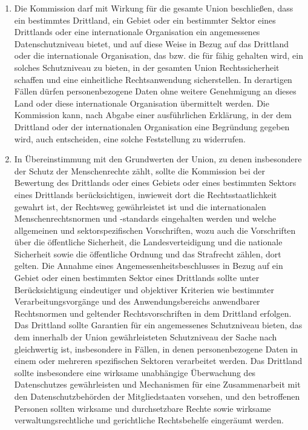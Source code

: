 \begin{enumerate}
   \item Die Kommission darf mit Wirkung für die gesamte Union beschließen, dass ein bestimmtes Drittland, ein Gebiet
    oder ein bestimmter Sektor eines Drittlands oder eine internationale Organisation ein angemessenes
    Datenschutzniveau bietet, und auf diese Weise in Bezug auf das Drittland oder die internationale Organisation, das
    bzw. die für fähig gehalten wird, ein solches Schutzniveau zu bieten, in der gesamten Union Rechtssicherheit
    schaffen und eine einheitliche Rechtsanwendung sicherstellen. In derartigen Fällen dürfen personenbezogene Daten
    ohne weitere Genehmigung an dieses Land oder diese internationale Organisation übermittelt werden. Die Kommission
    kann, nach Abgabe einer ausführlichen Erklärung, in der dem Drittland oder der internationalen Organisation eine
    Begründung gegeben wird, auch entscheiden, eine solche Feststellung zu widerrufen.%
   \label{eg:103}
   

   \item In Übereinstimmung mit den Grundwerten der Union, zu denen insbesondere der Schutz der Menschenrechte zählt,
    sollte die Kommission bei der Bewertung des Drittlands oder eines Gebiets oder eines bestimmten Sektors eines
    Drittlands berücksichtigen, inwieweit dort die Rechtsstaatlichkeit gewahrt ist, der Rechtsweg gewährleistet ist und
    die internationalen Menschenrechtsnormen und -standards eingehalten werden und welche allgemeinen und
    sektorspezifischen Vorschriften, wozu auch die Vorschriften über die öffentliche Sicherheit, die Landesverteidigung
    und die nationale Sicherheit sowie die öffentliche Ordnung und das Strafrecht zählen, dort gelten. Die Annahme
    eines Angemessenheitsbeschlusses in Bezug auf ein Gebiet oder einen bestimmten Sektor eines Drittlands sollte unter
    Berücksichtigung eindeutiger und objektiver Kriterien wie bestimmter Verarbeitungsvorgänge und des
    Anwendungsbereichs anwendbarer Rechtsnormen und geltender Rechtsvorschriften in dem Drittland erfolgen. Das
    Drittland sollte Garantien für ein angemessenes Schutzniveau bieten, das dem innerhalb der Union gewährleisteten
    Schutzniveau der Sache nach gleichwertig ist, insbesondere in Fällen, in denen personenbezogene Daten in einem oder
    mehreren spezifischen Sektoren verarbeitet werden. Das Drittland sollte insbesondere eine wirksame unabhängige
    Überwachung des Datenschutzes gewährleisten und Mechanismen für eine Zusammenarbeit mit den Datenschutzbehörden der
    Mitgliedstaaten vorsehen, und den betroffenen Personen sollten wirksame und durchsetzbare Rechte sowie wirksame
    verwaltungsrechtliche und gerichtliche Rechtsbehelfe eingeräumt werden.%
   \label{eg:104}
   

\end{enumerate}
